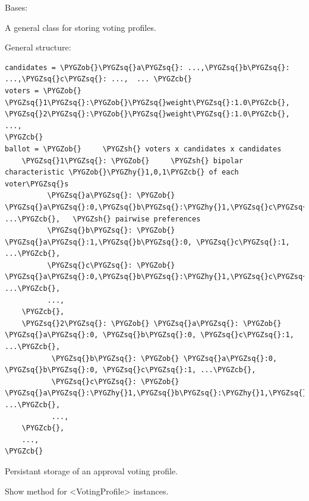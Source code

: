 \documentclass[letterpaper,10pt,english]{sphinxmanual}
\def\PYGZob{\char`\{}
\def\PYGZcb{\char`\}}
\def\PYGZsh{\char`\#}
\def\PYGZhy{\char`\-}
\def\PYGZsq{\char`\'}
\begin{document}
\begin{fulllineitems}
\label{techDoc:votingDigraphs.VotingProfile}
Bases: 

A general class for storing voting profiles.

General structure:

\begin{Verbatim}[commandchars=\\\{\}]
candidates = \PYGZob{}\PYGZsq{}a\PYGZsq{}: ...,\PYGZsq{}b\PYGZsq{}: ...,\PYGZsq{}c\PYGZsq{}: ...,  ... \PYGZcb{}
voters = \PYGZob{}
\PYGZsq{}1\PYGZsq{}:\PYGZob{}\PYGZsq{}weight\PYGZsq{}:1.0\PYGZcb{},
\PYGZsq{}2\PYGZsq{}:\PYGZob{}\PYGZsq{}weight\PYGZsq{}:1.0\PYGZcb{},
...,
\PYGZcb{}
ballot = \PYGZob{}     \PYGZsh{} voters x candidates x candidates
    \PYGZsq{}1\PYGZsq{}: \PYGZob{}     \PYGZsh{} bipolar characteristic \PYGZob{}\PYGZhy{}1,0,1\PYGZcb{} of each voter\PYGZsq{}s
          \PYGZsq{}a\PYGZsq{}: \PYGZob{} \PYGZsq{}a\PYGZsq{}:0,\PYGZsq{}b\PYGZsq{}:\PYGZhy{}1,\PYGZsq{}c\PYGZsq{}:0, ...\PYGZcb{},   \PYGZsh{} pairwise preferences
          \PYGZsq{}b\PYGZsq{}: \PYGZob{} \PYGZsq{}a\PYGZsq{}:1,\PYGZsq{}b\PYGZsq{}:0, \PYGZsq{}c\PYGZsq{}:1, ...\PYGZcb{},
          \PYGZsq{}c\PYGZsq{}: \PYGZob{} \PYGZsq{}a\PYGZsq{}:0,\PYGZsq{}b\PYGZsq{}:\PYGZhy{}1,\PYGZsq{}c\PYGZsq{}:0, ...\PYGZcb{},
          ...,
    \PYGZcb{},
    \PYGZsq{}2\PYGZsq{}: \PYGZob{} \PYGZsq{}a\PYGZsq{}: \PYGZob{} \PYGZsq{}a\PYGZsq{}:0, \PYGZsq{}b\PYGZsq{}:0, \PYGZsq{}c\PYGZsq{}:1, ...\PYGZcb{},
           \PYGZsq{}b\PYGZsq{}: \PYGZob{} \PYGZsq{}a\PYGZsq{}:0, \PYGZsq{}b\PYGZsq{}:0, \PYGZsq{}c\PYGZsq{}:1, ...\PYGZcb{},
           \PYGZsq{}c\PYGZsq{}: \PYGZob{} \PYGZsq{}a\PYGZsq{}:\PYGZhy{}1,\PYGZsq{}b\PYGZsq{}:\PYGZhy{}1,\PYGZsq{}c\PYGZsq{}:0, ...\PYGZcb{},
           ...,
    \PYGZcb{},
    ...,
\PYGZcb{}
\end{Verbatim}

\begin{fulllineitems}
\label{techDoc:votingDigraphs.VotingProfile.save}
Persistant storage of an approval voting profile.

\end{fulllineitems}


\begin{fulllineitems}
\label{techDoc:votingDigraphs.VotingProfile.showAll}
Show method for \textless{}VotingProfile\textgreater{} instances.


\end{fulllineitems}
\end{fulllineitems}
\end{document}
